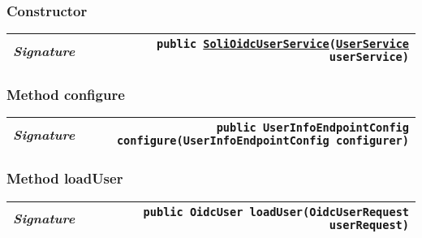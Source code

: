 \begin{adjustwidth}{1.5em}{0pt}
\begin{adjustwidth}{1.5em}{0pt}
{\begin{tabularx}{1.0\linewidth}{@{}l R@{}}
    \end{tabularx}}\subsubsection{Constructor\label{edu.kit.hci.soli.config.security.SoliOidcUserService@edu.kit.hci.soli.config.security.SoliOidcUserService(edu.kit.hci.soli.service.UserService)}}
    \begin{adjustwidth}{1.5em}{0pt}
      {\begin{tabularx}{1.0\linewidth}{@{}l R@{}}
        \emph{Signature} & \texttt{public \texttt{\hyperref[edu.kit.hci.soli.config.security.SoliOidcUserService]{\texttt{SoliOidcUserService}}}(\texttt{\hyperref[edu.kit.hci.soli.service.UserService]{\texttt{UserService}}} userService)} \\
        \hline
  
      \end{tabularx}}
    \end{adjustwidth}\subsubsection{Method configure\label{edu.kit.hci.soli.config.security.SoliOidcUserService@configure(OAuth2LoginConfigurer\$UserInfoEndpointConfig)}}
    \begin{adjustwidth}{1.5em}{0pt}
      {\begin{tabularx}{1.0\linewidth}{@{}l R@{}}
        \emph{Signature} & \texttt{public \texttt{UserInfoEndpointConfig} configure(\texttt{UserInfoEndpointConfig} configurer)} \\
        \hline
  
      \end{tabularx}}
    \end{adjustwidth}\subsubsection{Method loadUser\label{edu.kit.hci.soli.config.security.SoliOidcUserService@loadUser(org.springframework.security.oauth2.client.oidc.userinfo.OidcUserRequest)}}
    \begin{adjustwidth}{1.5em}{0pt}
      {\begin{tabularx}{1.0\linewidth}{@{}l R@{}}
        \emph{Signature} & \texttt{public \texttt{OidcUser} loadUser(\texttt{OidcUserRequest} userRequest)} \\
        \hline
  

\end{tabularx}}
\end{adjustwidth}
\end{adjustwidth}
\end{adjustwidth}
